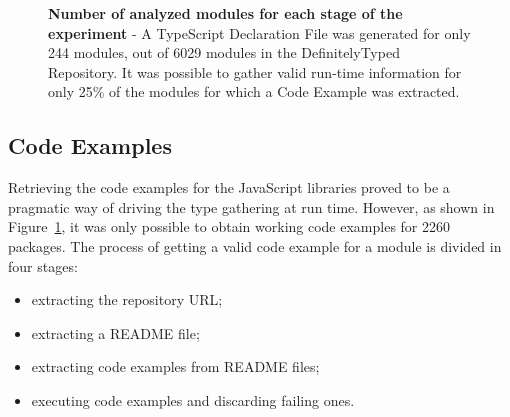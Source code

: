 \documentclass[english,cleveref,autoref,submission]{programming}
\newcommand{\figref}[1]{Figure~\ref{#1}}
\begin{document}
\begin{figure}[tp]
	\hspace*{-0.16\textwidth}
	\centering
	\caption[Number of analyzed modules for each stage of the experiment]{\textbf{Number of analyzed modules for each stage of the experiment} - A TypeScript Declaration File was generated for only 244 modules, out of 6029 modules in the DefinitelyTyped Repository. It was possible to gather valid run-time information for only 25\% of the modules for which a Code Example was extracted.}
	\label{fig:experiments-overall-funnel}
\end{figure}

\subsection{Code Examples}
Retrieving the code examples for the JavaScript libraries proved to be
a pragmatic way of driving the type gathering at run time. However, as
shown in \figref{fig:experiments-overall-funnel}, it was only possible
to obtain working code examples for 2260 packages. The
process of getting a valid code example for a module is divided in four
stages: 
\begin{itemize}
\item extracting the repository URL;
\item extracting a README file;
\item extracting code examples from README files;
\item executing code examples and discarding failing ones.
\end{itemize}
\end{document}
